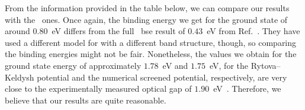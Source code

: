 From the information provided in the table below, we can compare our results with the \abinit~ones.
Once again, the binding energy we get for the ground state of around $0.80$~\unit{\electronvolt} differs from the full \abinit~\gls{bse} result of $0.43$~\unit{\electronvolt} from Ref.~\cite{Latini_2015}.
They have used a different model for  with a different band structure, though, so comparing the binding energies might not be fair.
Nonetheless, the values we obtain for the ground state energy of approximately $1.78$~\unit{\electronvolt} and $1.75$~\unit{\electronvolt}, for the Rytova--Keldysh potential and the numerical screened potential, respectively, are very close to the experimentally measured optical gap of $1.90$~\unit{\electronvolt}~\cite{MoS2_Optical_Gap,Photoluminescence_MoS2}.
Therefore, we believe that our results are quite reasonable.

